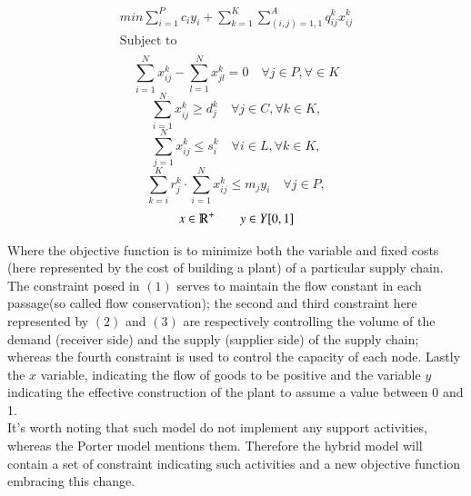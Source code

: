 \documentclass{article}
\begin{document}
\begin{equation*}
\begin{aligned}
	min \sum_{i=1}^{P} c_i y_i  + \sum_{k=1}^{K} \sum_{(i,j)=1,1}^{A} q_{ij}^{k}x_{ij}^{k}
  \\
  \text{Subject to}
  \\
\end{aligned}
\end{equation*}
\begin{equation}
  \sum_{i=1}^{N} x_{ij}^k - \sum_{l=1}^{N} x_{jl}^k = 0 \quad \forall j \in P, \forall \in K
\end{equation}
\begin{equation}
  \sum_{i=1}^{N} x_{ij}^k \geq d_{j}^k \quad \forall j \in C, \forall k \in K,
\end{equation}
\begin{equation}
  \sum_{j=1}^{N} x_{ij}^{k} \leq s_{i}^{k}  \quad \forall i \in L, \forall k \in K,
\end{equation}
\begin{equation}
\sum_{k=i}^{K} r_{j}^k \cdot \sum_{i=1}^{N}x_{ij}^k \leq m_j y_i \quad \forall j \in P,
\end{equation}
\begin{equation}
  x \in \varmathbb{R}^+ \quad \quad 
  y \in Y[0,1] 
\end{equation}

Where the objective function  is to minimize both the variable and fixed costs (here represented by the cost of building a plant) of a particular supply chain.
The constraint posed in $(1)$ serves to maintain the flow constant in each passage(so called flow conservation); the second and third constraint here represented by $(2)$ and $(3)$ are respectively controlling the volume of the demand (receiver side) and the supply (supplier side) of the supply chain; whereas the fourth constraint is used to control the capacity of each node. Lastly the $x$ variable, indicating the flow of goods to be positive and the variable $y$ indicating the effective construction of the plant to assume a value between 0 and 1. 
\\
It's worth noting that such model do not implement any support activities, whereas the Porter model mentions them. Therefore the hybrid model will contain a set of constraint indicating such activities and a new objective function embracing this change.
\end{document}
